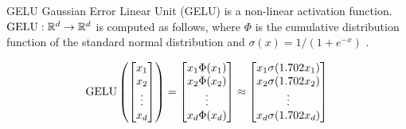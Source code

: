 \begin{definition}{GELU}{}
    Gaussian Error Linear Unit (GELU) is a non-linear activation function. $\text{GELU} : \mathbb{R}^d\to \mathbb{R}^d$ is computed as follows, where $\Phi$ is the cumulative distribution function of the standard normal distribution and $\sigma(x) = 1/(1+e^{-x})$ \cite{hendrycks2023}.

    \[\text{GELU}\left(\begin{bmatrix}
                x_1    \\
                x_2    \\
                \vdots \\
                x_d    \\
            \end{bmatrix}\right) = \begin{bmatrix}
            x_1 \Phi(x_1) \\
            x_2 \Phi(x_2) \\
            \vdots        \\
            x_d \Phi(x_d) \\
        \end{bmatrix} \approx \begin{bmatrix}
            x_1 \sigma(1.702 x_1) \\
            x_2 \sigma(1.702 x_2) \\
            \vdots                \\
            x_d \sigma(1.702 x_d) \\
        \end{bmatrix} \]
\end{definition}

